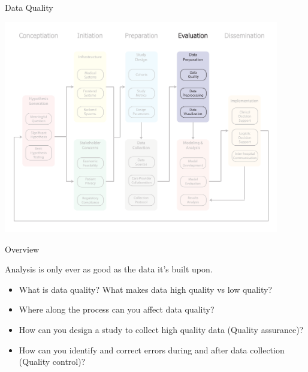 \documentclass[10pt, xcolor=table]{beamer}
\begin{document}
\begin{frame}{Data Quality}
	\begin{center}
		\includegraphics[width=0.9\textwidth]{images/informatics_pipeline_data_quality.pdf}	
	\end{center}
\end{frame}






\begin{frame}{Overview}
	\begin{center}
		Analysis is only ever as good as the data it's built upon.
	\end{center}
	\begin{itemize}%
		\item What is data quality? What makes data high quality vs low quality?
		\item Where along the process can you affect data quality?
		\item How can you design a study to collect high quality data (Quality assurance)?
		\item How can you identify and correct errors during and after data collection (Quality control)?
	\end{itemize}
\end{frame}
\end{document}
